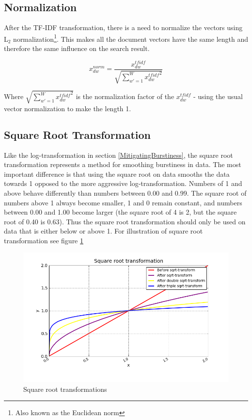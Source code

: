 \subsection{Normalization} 

After the TF-IDF transformation, there is a need to normalize the
vectors using L$_2$ normalization\footnote{Also known as the
  Euclidean norm}. This makes all the document vectors have the same
length and therefore the same influence on the search result.

\[
x_{dw}^{norm} = \frac{x_{dw}^{tfidf}}{\sqrt{\sum_{w\prime = 1}^{W} {x_{dw}^{tfidf}}^{2}}}
\]

Where $\sqrt{\sum_{w\prime = 1}^{W} {x_{dw}^{tfidf}}^{2}}$ is the
normalization factor of the $x_{dw}^{tfidf}$ - using the usual vector
normalization to make the length 1.

\subsection{Square Root Transformation\label{SquareRoot}}

Like the log-transformation in section \ref{MitigatingBurstiness}, the
square root transformation represents a method for smoothing
burstiness in data. The most important difference is that using the
square root on data smooths the data towards 1 opposed to the
more aggressive log-transformation. Numbers of 1 and above behave
differently than numbers between 0.00 and 0.99. The square root of
numbers above 1 always become smaller, 1 and 0 remain constant, and
numbers between 0.00 and 1.00 become larger (the square root of 4 is
2, but the square root of 0.40 is 0.63). Thus the square root
transformation should only be used on data that is either below or
above 1. For illustration of square root transformation see figure
\ref{SqrtTransformations}

\begin{figure}[H]
        \begin{center}
          \includegraphics[width=1.0\textwidth]{barcharts/sqrt_graph.png}
        \end{center}
        \caption{Square root transformations}
        \label{SqrtTransformations}
\end{figure}

